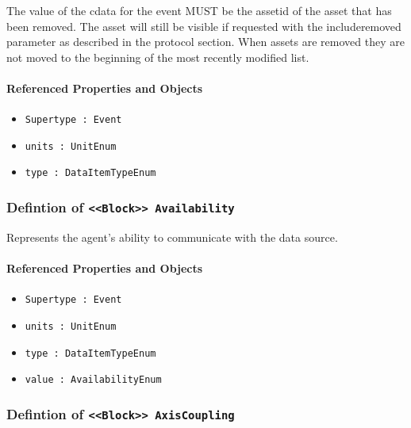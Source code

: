 \FloatBarrier

The value of the cdata for the event MUST be the assetid of the asset that has been removed. The asset will still be visible if requested with the includeremoved parameter as described in the protocol section. When assets are removed they are not moved to the beginning of the most recently modified list.

\FloatBarrier
\paragraph{Referenced Properties and Objects}

\begin{itemize}
\item \texttt{Supertype : Event}

\item \texttt{units : UnitEnum}

\item \texttt{type : DataItemTypeEnum}

\end{itemize}
\FloatBarrier
\subsubsection{Defintion of \texttt{<<Block>> Availability}}
  \label{type:Availability}

\FloatBarrier

Represents the agent's ability to communicate with the data source.

\FloatBarrier
\paragraph{Referenced Properties and Objects}

\begin{itemize}
\item \texttt{Supertype : Event}

\item \texttt{units : UnitEnum}

\item \texttt{type : DataItemTypeEnum}

\item \texttt{value : AvailabilityEnum}

\end{itemize}
\FloatBarrier
\subsubsection{Defintion of \texttt{<<Block>> AxisCoupling}}
  \label{type:AxisCoupling}

